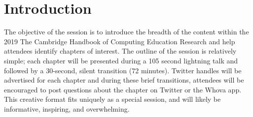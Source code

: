 \documentclass[sigconf]{acmart}
\begin{document}
\section{Introduction} 
The objective of the session is to introduce the breadth of the content within the 2019 The Cambridge Handbook of Computing Education Research and help attendees identify chapters of interest. The outline of the session is relatively simple; each chapter \cite{ch00, ch01, ch02, ch03, ch04, ch05, ch06, ch07, ch08, ch09, ch10, ch11, ch12, ch13, ch14, ch15, ch16, ch17, ch18, ch19, ch20, ch21, ch22, ch23, ch24, ch25, ch26, ch27, ch28, ch29, ch30, ch31}  will be presented during a 105 second lightning talk and followed by a 30-second, silent transition (72 minutes). Twitter handles will be advertised for each chapter and during these brief transitions, attendees will be encouraged to post questions about the chapter on Twitter or the Whova app. This creative format fits uniquely as a special session, and will likely be informative, inspiring, and overwhelming. 
\end{document}
